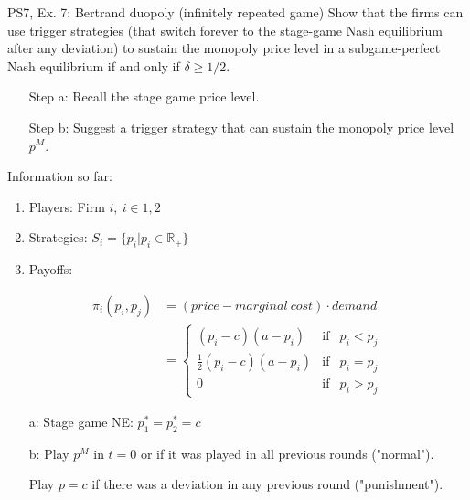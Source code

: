 \begin{frame}{PS7, Ex. 7: Bertrand duopoly (infinitely repeated game)}
    Show that the firms can use trigger strategies (that switch forever to the stage-game Nash equilibrium after any deviation) to sustain the monopoly price level in a subgame-perfect Nash equilibrium if and only if $\delta\geq1/2$.
    \vspace{-6pt}
    \begin{multicols}{2}
      \begin{itemize}
        \item[Step a:] Recall the stage game price level.
        \item[Step b:] Suggest a trigger strategy that can sustain the monopoly price level $p^M$.
      \end{itemize}
      \vspace{-4pt}
      \vfill\null\columnbreak
      Information so far:
      \vspace{-4pt}
      \begin{enumerate}
        \item Players: Firm $i,\ i\in1,2$
        \item Strategies: $S_i=\{p_i|p_i\in\mathbb{R}_+\}$
        \item Payoffs:
      \end{enumerate}
      \vspace{-12pt}
      \begin{align*}
        \pi_i(p_i,p_j)&=(price-marginal\ cost)\cdot demand\\
                      &=\left\{\begin{array}{lcl}
          (p_i-c)(a-p_i)            & \text{if} & p_i<p_j\\
          \frac{1}{2}(p_i-c)(a-p_i) & \text{if} & p_i=p_j\\
          0                         & \text{if} & p_i>p_j
        \end{array}\right.
      \end{align*}
      \vspace{-16pt}
      \begin{itemize}
        \item[a:] Stage game NE: $p_1^*=p_2^*=c$
        \item[b:] Play $p^M$ in $t=0$ or if it was played in all previous rounds ("normal").
        \item[]   Play $p=c$ if there was a deviation in any previous round ("punishment").
      \end{itemize}
      \vfill\null
    \end{multicols}
\end{frame}
